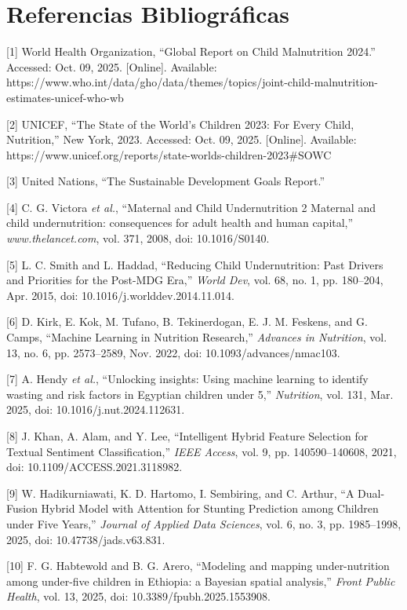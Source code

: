 \documentclass[
]{report}
\begin{document}
\hypertarget{referencias-bibliogruxe1ficas}{%
\section{Referencias
Bibliográficas}\label{referencias-bibliogruxe1ficas}}

{[}1{]} World Health Organization, ``Global Report on Child Malnutrition
2024.'' Accessed: Oct. 09, 2025. {[}Online{]}. Available:
https://www.who.int/data/gho/data/themes/topics/joint-child-malnutrition-estimates-unicef-who-wb

{[}2{]} UNICEF, ``The State of the World's Children 2023: For Every
Child, Nutrition,'' New York, 2023. Accessed: Oct. 09, 2025.
{[}Online{]}. Available:
https://www.unicef.org/reports/state-worlds-children-2023\#SOWC

{[}3{]} United Nations, ``The Sustainable Development Goals Report.''

{[}4{]} C. G. Victora \emph{et al.}, ``Maternal and Child Undernutrition
2 Maternal and child undernutrition: consequences for adult health and
human capital,'' \emph{www.thelancet.com}, vol. 371, 2008, doi:
10.1016/S0140.

{[}5{]} L. C. Smith and L. Haddad, ``Reducing Child Undernutrition: Past
Drivers and Priorities for the Post-MDG Era,'' \emph{World Dev}, vol.
68, no. 1, pp. 180--204, Apr. 2015, doi: 10.1016/j.worlddev.2014.11.014.

{[}6{]} D. Kirk, E. Kok, M. Tufano, B. Tekinerdogan, E. J. M. Feskens,
and G. Camps, ``Machine Learning in Nutrition Research,'' \emph{Advances
in Nutrition}, vol. 13, no. 6, pp. 2573--2589, Nov. 2022, doi:
10.1093/advances/nmac103.

{[}7{]} A. Hendy \emph{et al.}, ``Unlocking insights: Using machine
learning to identify wasting and risk factors in Egyptian children under
5,'' \emph{Nutrition}, vol. 131, Mar. 2025, doi:
10.1016/j.nut.2024.112631.

{[}8{]} J. Khan, A. Alam, and Y. Lee, ``Intelligent Hybrid Feature
Selection for Textual Sentiment Classification,'' \emph{IEEE Access},
vol. 9, pp. 140590--140608, 2021, doi: 10.1109/ACCESS.2021.3118982.

{[}9{]} W. Hadikurniawati, K. D. Hartomo, I. Sembiring, and C. Arthur,
``A Dual-Fusion Hybrid Model with Attention for Stunting Prediction
among Children under Five Years,'' \emph{Journal of Applied Data
Sciences}, vol. 6, no. 3, pp. 1985--1998, 2025, doi:
10.47738/jads.v63.831.

{[}10{]} F. G. Habtewold and B. G. Arero, ``Modeling and mapping
under-nutrition among under-five children in Ethiopia: a Bayesian
spatial analysis,'' \emph{Front Public Health}, vol. 13, 2025, doi:
10.3389/fpubh.2025.1553908.
\end{document}
